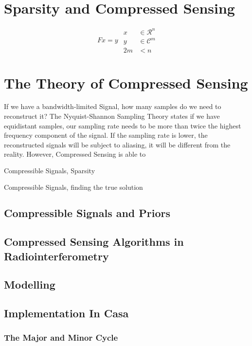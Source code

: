 \section{Sparsity and Compressed Sensing}

\begin{equation}\label{intro:underdetermined}
\begin{split}
Fx = y
\end{split}
\begin{split}
x &\in \mathcal{R}^n\\
y &\in \mathcal{C}^m\\
2m &< n
\end{split}
\end{equation}

\section{The Theory of Compressed Sensing} \label{cs}
If we have a bandwidth-limited Signal, how many samples do we need to reconstruct it? The Nyquist-Shannon Sampling Theory states if we have equidistant samples, our sampling rate needs to be more than twice the highest frequency component of the signal. If the sampling rate is lower, the reconstructed signals will be subject to aliasing, it will be different from the reality. However, Compressed Sensing is able to 

Compressible Signals, Sparsity


Compressible Signals, finding the true solution

\subsection{Compressible Signals and Priors}


\subsection{Compressed Sensing Algorithms in Radiointerferometry}

\subsection{Modelling}

\subsection{Implementation In Casa}

\subsubsection{The Major and Minor Cycle}

